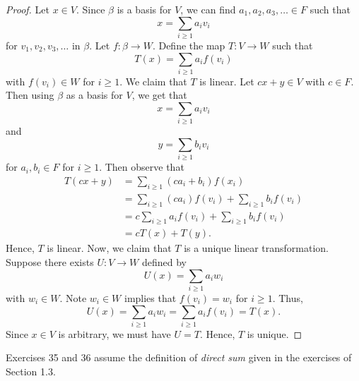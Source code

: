 \begin{proof}
    Let \( x \in V  \). Since \( \beta  \) is a basis for \( V  \), we can find \( a_{1}, a_{2}, a_{3}, \dots  \in F  \) such that
    \[  x = \sum_{i \geq 1 } a_{i} v_{i}  \] for \( v_{1}, v_{2}, v_{3}, \dots  \) in \( \beta  \). Let \( f: \beta \to W  \). Define the map \( T:V \to W  \) such that
    \[  T(x) = \sum_{i \geq 1 } a_{i} f(v_{i})   \]
    with \( f(v_{i}) \in W  \) for \( i \geq 1  \). We claim that \( T  \) is linear. Let \( cx+y \in V  \) with \( c \in F  \). Then using \( \beta  \) as a basis for \( V  \), we get that
    \[  x = \sum_{i \geq 1 } a_{i} v_{i} \]
    and 
    \[  y = \sum_{i \geq 1 } b_{i} v_{i} \] for \( a_{i}, b_{i} \in F  \) for \( i \geq 1  \). Then observe that
    \begin{align*}
        T(cx+y)&= \sum _{i \geq 1 } (ca_{i} + b_{i}) f(x_{i}) \\
               &= \sum _{i \geq 1 } (ca_{i}) f(v_{i}) + \sum_{i \geq 1} b_{i} f(v_{i}) \\
               &= c \sum_{i \geq 1 } a_{i} f(v_{i}) + \sum_{i \geq 1} b_{i} f(v_{i}) \\
               &= cT(x) + T(y).
    \end{align*}
    Hence, \( T  \) is linear. Now, we claim that \( T  \) is a unique linear transformation. Suppose there exists \( U: V \to W  \) defined by  
    \[  U(x) = \sum _{i \geq 1} a_{i} w_{i}  \] with \( w_{i} \in W  \).
    Note \( w_{i} \in W  \) implies that \( f(v_{i}) = w_{i} \) for \( i \geq 1  \). Thus, 
    \[  U(x) = \sum _{i \geq 1 } a_{i} w_{i} = \sum _{i \geq 1} a_{i} f(v_{i}) = T(x).  \]
    Since \( x \in V  \) is arbitrary, we must have \( U = T \). Hence, \( T  \) is unique.
\end{proof}

Exercises 35 and 36 assume the definition of \textit{direct sum} given in the exercises of Section 1.3.

